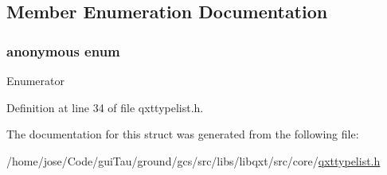 \subsection{Member Enumeration Documentation}
\hypertarget{struct_qxt_type_1_1_no_extend_a8ed63dff8fac2c0a1c00ad54f033e6fe}{\subsubsection[{anonymous enum}]{\setlength{\rightskip}{0pt plus 5cm}anonymous enum}}\label{struct_qxt_type_1_1_no_extend_a8ed63dff8fac2c0a1c00ad54f033e6fe}
\begin{Desc}
\item[Enumerator]\par
\begin{description}
\item[{\em 
\hypertarget{struct_qxt_type_1_1_no_extend_a8ed63dff8fac2c0a1c00ad54f033e6fead31ee7c652329d8e53bdc514da30264f}{length}\label{struct_qxt_type_1_1_no_extend_a8ed63dff8fac2c0a1c00ad54f033e6fead31ee7c652329d8e53bdc514da30264f}
}]\item[{\em 
\hypertarget{struct_qxt_type_1_1_no_extend_a8ed63dff8fac2c0a1c00ad54f033e6fea4ffa43af688cbd66562d1f8d693dd9dc}{extends}\label{struct_qxt_type_1_1_no_extend_a8ed63dff8fac2c0a1c00ad54f033e6fea4ffa43af688cbd66562d1f8d693dd9dc}
}]\end{description}
\end{Desc}


Definition at line 34 of file qxttypelist.\-h.



The documentation for this struct was generated from the following file\-:\begin{DoxyCompactItemize}
\item 
/home/jose/\-Code/gui\-Tau/ground/gcs/src/libs/libqxt/src/core/\hyperlink{qxttypelist_8h}{qxttypelist.\-h}\end{DoxyCompactItemize}
